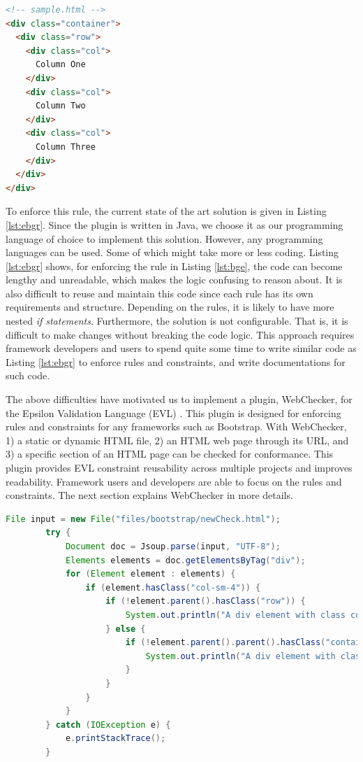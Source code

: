 \documentclass[conference]{IEEETran}
\begin{document}
\begin{lstlisting}[language=HTML, caption=Bootstrap Grid Example, label={lst:bge}]
<!-- sample.html -->
<div class="container">
  <div class="row">
    <div class="col">
      Column One
    </div>
    <div class="col">
      Column Two
    </div>
    <div class="col">
      Column Three
    </div>
  </div>
</div>
\end{lstlisting}

To enforce this rule, the current state of the art solution is given in Listing \ref{lst:ebgr}. Since the plugin is written in Java, we choose it as our programming language of choice to implement this solution. However, any programming languages can be used. Some of which might take more or less coding. Listing \ref{lst:ebgr} shows, for enforcing the rule in Listing \ref{lst:bge}, the code can become lengthy and unreadable, which makes the logic confusing to reason about. It is also difficult to reuse and maintain this code since each rule has its own requirements and structure. Depending on the rules, it is likely to have more nested \textit{if statements}. Furthermore, the solution is not configurable. That is, it is difficult to make changes without breaking the code logic. This approach requires framework developers and users to spend quite some time to write similar code as Listing \ref{lst:ebgr} to enforce rules and constraints, and write documentations for such code.   

The above difficulties have motivated us to implement a plugin, WebChecker, for the Epsilon Validation Language (EVL) \cite{Kolovos2009}.  This plugin is designed for enforcing rules and constraints for any frameworks such as Bootstrap. With WebChecker, 1) a static or dynamic HTML file, 2) an HTML web page through its URL, and 3) a specific section of an HTML page can be checked for conformance. This plugin provides EVL constraint reusability across multiple projects and improves readability. Framework users and developers are able to focus on the rules and constraints. The next section explains WebChecker in more details.    

\begin{lstlisting}[language=Java, caption=Enforcing Bootstrap Grid Rule, label={lst:ebgr}]
		File input = new File("files/bootstrap/newCheck.html");
		try {
			Document doc = Jsoup.parse(input, "UTF-8");
			Elements elements = doc.getElementsByTag("div");
			for (Element element : elements) {
				if (element.hasClass("col-sm-4")) {					
					if (!element.parent().hasClass("row")) {
						System.out.println("A div element with class col should have a parent element with class row");
					} else {
						if (!element.parent().parent().hasClass("container")) {
							System.out.println("A div element with class col should have a parent element with class row, which has a parent with class container.");
						}
					}
				}
			}		
		} catch (IOException e) {
			e.printStackTrace();
		}
\end{lstlisting}
\end{document}

